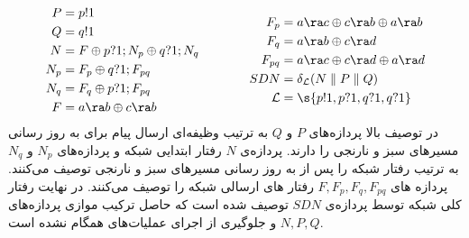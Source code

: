 \begin{equation*}
    \begin{aligned}[c]
        P   & = p!1                             \\
        Q   & = q!1                             \\
        N   & = F \oplus p?1;N_p \oplus q?1;N_q \\
        N_p & = F_p \oplus q?1;F_{pq}           \\
        N_q & = F_q \oplus p?1;F_{pq}           \\
        F   & = a\ra b \oplus c\ra b            \\
    \end{aligned}
    \qquad\qquad
    \begin{aligned}[c]
        F_p         & = a\ra c \oplus c\ra b \oplus a\ra b \\
        F_q         & = a\ra b \oplus c\ra d               \\
        F_{pq}      & = a\ra c \oplus c\ra d \oplus a\ra d \\
        SDN         & = \delta_{\mathcal{L}} (N
        \parallel P \parallel Q)                           \\
        \mathcal{L} & = \s{p!1,p?1,q?1,q?1}                \\
    \end{aligned}
\end{equation*}
در توصیف بالا پردازه‌های
$P$
و
$Q$
به ترتیب وظیفه‌ای ارسال پیام برای به روز رسانی مسیر‌های سبز و نارنجی را دارند.
پردازه‌ی
$N$
رفتار ابتدایی شبکه و پردازه‌های
$N_p$
و
$N_q$
به ترتیب رفتار شبکه را پس از به روز رسانی مسیر‌های سبز و نارنجی توصیف می‌کنند.
پردازه‌ های
$F,F_p,F_q,F_{pq}$
رفتار های ارسالی
شبکه را توصیف می‌کنند.
در نهایت رفتار کلی شبکه توسط پردازه‌ی
$SDN$
توصیف شده است که حاصل ترکیب موازی پردازه‌های
$N,P,Q$
و جلوگیری از اجرای عملیات‌های همگام نشده است.
\begin{figure}
    \centering
    \caption{}
    \label{fig:blacklist:lts}
\end{figure}
